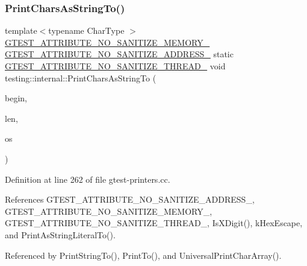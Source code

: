 \subsubsection{\texorpdfstring{Print\+Chars\+As\+String\+To()}{PrintCharsAsStringTo()}}
{\footnotesize\ttfamily template$<$typename Char\+Type $>$ \\
\hyperlink{gtest-port_8h_a2a83dd79037e53814a509cc3f5702650}{G\+T\+E\+S\+T\+\_\+\+A\+T\+T\+R\+I\+B\+U\+T\+E\+\_\+\+N\+O\+\_\+\+S\+A\+N\+I\+T\+I\+Z\+E\+\_\+\+M\+E\+M\+O\+R\+Y\+\_\+} \hyperlink{gtest-port_8h_af18b465f4ba6e36eea7a8d2d79521873}{G\+T\+E\+S\+T\+\_\+\+A\+T\+T\+R\+I\+B\+U\+T\+E\+\_\+\+N\+O\+\_\+\+S\+A\+N\+I\+T\+I\+Z\+E\+\_\+\+A\+D\+D\+R\+E\+S\+S\+\_\+} static \hyperlink{gtest-port_8h_abf30a6b1b3a12ecb2cc1bc1a6f5f9646}{G\+T\+E\+S\+T\+\_\+\+A\+T\+T\+R\+I\+B\+U\+T\+E\+\_\+\+N\+O\+\_\+\+S\+A\+N\+I\+T\+I\+Z\+E\+\_\+\+T\+H\+R\+E\+A\+D\+\_\+} void testing\+::internal\+::\+Print\+Chars\+As\+String\+To (\begin{DoxyParamCaption}\item[{const Char\+Type $\ast$}]{begin,  }\item[{size\+\_\+t}]{len,  }\item[{ostream $\ast$}]{os }\end{DoxyParamCaption})\hspace{0.3cm}{\ttfamily [static]}}



Definition at line 262 of file gtest-\/printers.\+cc.



References G\+T\+E\+S\+T\+\_\+\+A\+T\+T\+R\+I\+B\+U\+T\+E\+\_\+\+N\+O\+\_\+\+S\+A\+N\+I\+T\+I\+Z\+E\+\_\+\+A\+D\+D\+R\+E\+S\+S\+\_\+, G\+T\+E\+S\+T\+\_\+\+A\+T\+T\+R\+I\+B\+U\+T\+E\+\_\+\+N\+O\+\_\+\+S\+A\+N\+I\+T\+I\+Z\+E\+\_\+\+M\+E\+M\+O\+R\+Y\+\_\+, G\+T\+E\+S\+T\+\_\+\+A\+T\+T\+R\+I\+B\+U\+T\+E\+\_\+\+N\+O\+\_\+\+S\+A\+N\+I\+T\+I\+Z\+E\+\_\+\+T\+H\+R\+E\+A\+D\+\_\+, Is\+X\+Digit(), k\+Hex\+Escape, and Print\+As\+String\+Literal\+To().



Referenced by Print\+String\+To(), Print\+To(), and Universal\+Print\+Char\+Array().


